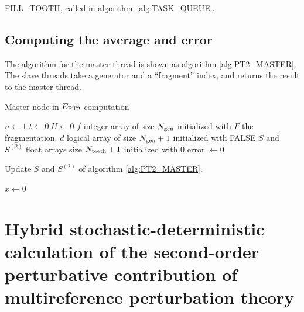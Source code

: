\documentclass[./thesis.tex]{subfiles}
\begin{document}
\begin{algorithm}
	\caption{FILL\_TOOTH, called in algorithm~\ref{alg:TASK_QUEUE}.}
	\label{alg:FILL_TOOTH}
	
\end{algorithm}

\subsection{Computing the average and error}

The algorithm for the master thread is shown as algorithm \ref{alg:PT2_MASTER}. The slave threads take a generator and a ``fragment'' index, and returns the result to the master thread.

\begin{algorithm}
	\caption{Master node in $E_\text{PT2}$ computation}
	\label{alg:PT2_MASTER}
	$n \gets 1$ \;
	$t \gets 0$ \;
	$U \gets 0$ \;
	$f$ integer array of size ${N_\text{gen}}$ initialized with $F$ the fragmentation. \;
	$d$ logical array of size ${N_\text{gen}}+1$ initialized with FALSE \;
	$S$ and $S^{(2)}$ float arrays size $N_\text{teeth}+1$ initialized with $0$ \;
        error $\gets 0$ \;
\end{algorithm}


\begin{algorithm}
	\caption{Update $S$ and $S^{(2)}$ of algorithm \ref{alg:PT2_MASTER}.}
	
					
	$x \gets 0$ \;
\end{algorithm}



\clearpage

\section{Hybrid stochastic-deterministic calculation of the second-order
perturbative contribution of multireference perturbation theory}

\end{document}
